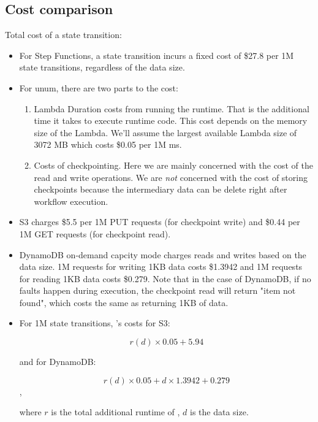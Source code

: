 \subsection{Cost comparison}

Total cost of a state transition:

\begin{itemize}

    \item For Step Functions, a state transition incurs a fixed cost of \$27.8
    per 1M state transitions, regardless of the data size.

    \item For unum, there are two parts to the cost:

    \begin{enumerate}

        \item Lambda Duration costs from running the \name{} runtime. That is
        the additional time it takes to execute \name{} runtime code. This
        cost depends on the memory size of the Lambda. We'll assume the
        largest available Lambda size of 3072 MB which costs \$0.05 per 1M ms.

        \item Costs of checkpointing. Here we are mainly concerned with the
        cost of the read and write operations. We are \emph{not} concerned
        with the cost of storing checkpoints because the intermediary data can
        be delete right after workflow execution.

    \end{enumerate}

    \item S3 charges \$5.5 per 1M PUT requests (for checkpoint write) and \$0.44
    per 1M GET requests (for checkpoint read).

    \item DynamoDB on-demand capcity mode charges reads and writes based on
    the data size. 1M requests for writing 1KB data costs \$1.3942 and 1M
    requests for reading 1KB data costs \$0.279. Note that in the case of
    DynamoDB, if no faults happen during execution, the checkpoint read will
    return "item not found", which costs the same as returning 1KB of data.

    \item For 1M state transitions, \name{}'s costs for S3:

    \[  r(d)\times0.05 + 5.94 \]

    and for DynamoDB:

    \[  r(d)\times0.05 + d\times1.3942 +0.279\],

    where $r$ is the total additional runtime of \name{}, $d$ is the data
    size.

\end{itemize}



